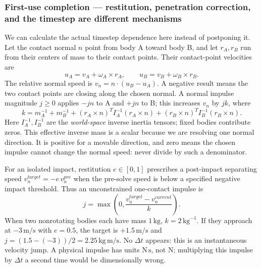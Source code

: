 \subsubsection{First-use completion --- restitution, penetration correction, and the timestep are different mechanisms}\label{06-engine-ii-ch038-first-use-completion-restitution-penetration-correction-and-the-timestep-are-different-mechanisms}

We can calculate the actual timestep dependence here instead of postponing it. Let the contact normal \(n\) point from body A toward body B, and let \(r_A,r_B\) run from their centers of mass to their contact points. Their contact-point velocities are \[
u_A=v_A+\omega_A\times r_A,\qquad
u_B=v_B+\omega_B\times r_B.
\] The relative normal speed is \(v_n=n\cdot(u_B-u_A)\). A negative result means the two contact points are closing along the chosen normal. A normal impulse magnitude \(j\geq0\) applies \(-jn\) to A and \(+jn\) to B; this increases \(v_n\) by \(jk\), where \[
k=m_A^{-1}+m_B^{-1}
 +(r_A\times n)^TI_A^{-1}(r_A\times n)
 +(r_B\times n)^TI_B^{-1}(r_B\times n).
\] Here \(I_A^{-1},I_B^{-1}\) are the \emph{world-space} inverse inertia tensors; fixed bodies contribute zeros. This effective inverse mass is a scalar because we are resolving one normal direction. It is positive for a movable direction, and zero means the chosen impulse cannot change the normal speed: never divide by such a denominator.

For an isolated impact, restitution \(e\in[0,1]\) prescribes a post-impact separating speed \(v_n^{target}=-e\,v_n^{pre}\) when the pre-solve speed is below a specified negative impact threshold. Thus an unconstrained one-contact impulse is \[
j=\max\!\left(0,\frac{v_n^{target}-v_n^{current}}{k}\right).
\] When two nonrotating bodies each have mass \(1\,\mathrm{kg}\), \(k=2\,\mathrm{kg}^{-1}\). If they approach at \(-3\,\mathrm{m/s}\) with \(e=0.5\), the target is \(+1.5\,\mathrm{m/s}\) and \(j=(1.5-(-3))/2=2.25\,\mathrm{kg\,m/s}\). No \(\Delta t\) appears: this is an instantaneous velocity jump. A physical impulse has units \(\mathrm{N\,s}\), not \(\mathrm N\); multiplying this impulse by \(\Delta t\) a second time would be dimensionally wrong.

